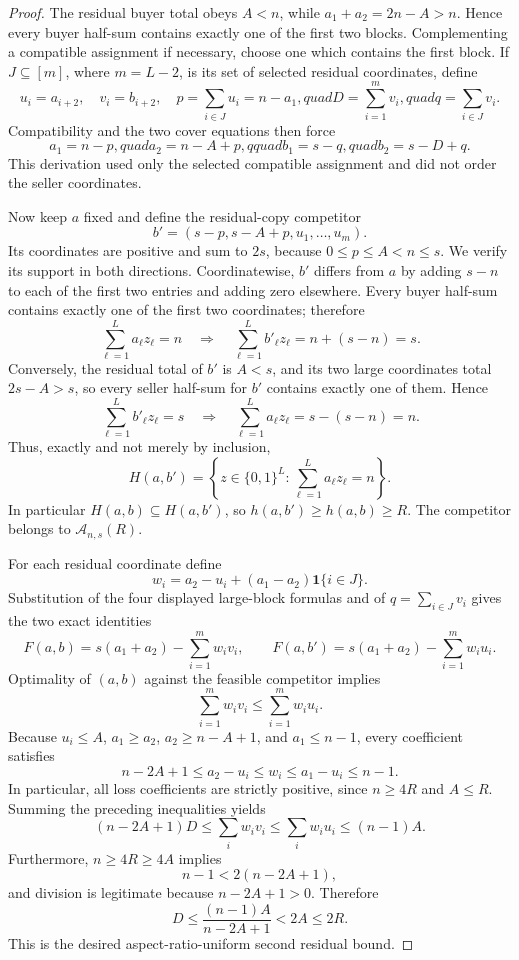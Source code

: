 \documentclass{article}
\begin{document}
\begin{proof}
The residual buyer total obeys \(A<n\), while \(a_1+a_2=2n-A>n\).  Hence every buyer half-sum contains exactly one of the first two blocks.  Complementing a compatible assignment if necessary, choose one which contains the first block.  If \(J\subseteq[m]\), where \(m=L-2\), is its set of selected residual coordinates, define
\[
 u_i=a_{i+2},\quad v_i=b_{i+2},\quad
 p=\sum_{i\in J}u_i=n-a_1,quad
 D=\sum_{i=1}^m v_i,quad q=\sum_{i\in J}v_i.
\]
Compatibility and the two cover equations then force
\[
 a_1=n-p,quad a_2=n-A+p,qquad
 b_1=s-q,quad b_2=s-D+q.
\]
This derivation used only the selected compatible assignment and did not order the seller coordinates.

Now keep \(a\) fixed and define the residual-copy competitor
\[
 b'=(s-p,s-A+p,u_1,\ldots,u_m).
\]
Its coordinates are positive and sum to \(2s\), because \(0\le p\le A<n\le s\).  We verify its support in both directions.  Coordinatewise, \(b'\) differs from \(a\) by adding \(s-n\) to each of the first two entries and adding zero elsewhere.  Every buyer half-sum contains exactly one of the first two coordinates; therefore
\[
 \sum_{\ell=1}^L a_\ell z_\ell=n
 \quad\Longrightarrow\quad
 \sum_{\ell=1}^L b'_\ell z_\ell=n+(s-n)=s.
\]
Conversely, the residual total of \(b'\) is \(A<s\), and its two large coordinates total \(2s-A>s\), so every seller half-sum for \(b'\) contains exactly one of them.  Hence
\[
 \sum_{\ell=1}^L b'_\ell z_\ell=s
 \quad\Longrightarrow\quad
 \sum_{\ell=1}^L a_\ell z_\ell=s-(s-n)=n.
\]
Thus, exactly and not merely by inclusion,
\[
 H(a,b')=\left\{z\in\{0,1\}^L:\sum_{\ell=1}^L a_\ell z_\ell=n\right\}.
\]
In particular \(H(a,b)\subseteq H(a,b')\), so \(h(a,b')\ge h(a,b)\ge R\).  The competitor belongs to \(\mathcal A_{n,s}(R)\).

For each residual coordinate define
\[
 w_i=a_2-u_i+(a_1-a_2)\mathbf 1\{i\in J\}.
\]
Substitution of the four displayed large-block formulas and of \(q=\sum_{i\in J}v_i\) gives the two exact identities
\[
 F(a,b)=s(a_1+a_2)-\sum_{i=1}^m w_iv_i,
 \qquad
 F(a,b')=s(a_1+a_2)-\sum_{i=1}^m w_iu_i.
\]
Optimality of \((a,b)\) against the feasible competitor implies
\[
 \sum_{i=1}^m w_iv_i\le\sum_{i=1}^m w_iu_i.
\]
Because \(u_i\le A\), \(a_1\ge a_2\), \(a_2\ge n-A+1\), and \(a_1\le n-1\), every coefficient satisfies
\[
 n-2A+1\le a_2-u_i\le w_i\le a_1-u_i\le n-1.
\]
In particular, all loss coefficients are strictly positive, since \(n\ge4R\) and \(A\le R\).  Summing the preceding inequalities yields
\[
 (n-2A+1)D
 \le\sum_iw_iv_i
 \le\sum_iw_iu_i
 \le(n-1)A.
\]
Furthermore, \(n\ge4R\ge4A\) implies
\[
 n-1<2(n-2A+1),
\]
and division is legitimate because \(n-2A+1>0\).  Therefore
\[
 D\le\frac{(n-1)A}{n-2A+1}<2A\le2R.
\]
This is the desired aspect-ratio-uniform second residual bound.


\end{proof}
\end{document}
